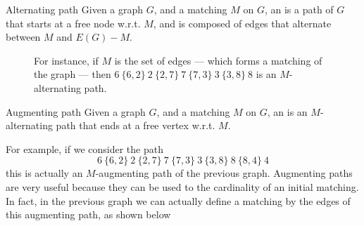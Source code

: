 \documentclass[a4paper, 12pt]{report}
\begin{document}
    \begin{frameddefn}{Alternating path}
        Given a graph $G$, and a matching $M$ on $G$, an  is a path of $G$ that starts at a free node w.r.t. $M$, and is composed of edges that alternate between $M$ and $E(G) - M$.
    \end{frameddefn}

    \begin{figure}[H]
        \centering
        \caption{For instance, if $M$ is the set of  edges --- which forms a matching of the graph --- then $6 \ \{6, 2\} \ 2 \ \{2, 7\} \ 7 \ \{7, 3\} \ 3 \ \{3, 8\} \ 8$ is an $M$-alternating path.}
    \end{figure}
    
    \begin{frameddefn}{Augmenting path}
        Given a graph $G$, and a matching $M$ on $G$, an  is an $M$-alternating path that ends at a free vertex w.r.t. $M$.
    \end{frameddefn}

    For example, if we consider the path $$6 \ \{6, 2\} \ 2 \ \{2, 7\} \ 7 \ \{7, 3\} \ 3 \ \{3, 8\} \ 8 \ \{8, 4 \} \ 4$$ this is actually an $M$-augmenting path of the previous graph. Augmenting paths are very useful because they can be used to  the cardinality of an initial matching. In fact, in the previous graph we can actually define a  matching by  the edges of this augmenting path, as shown below
\end{document}

